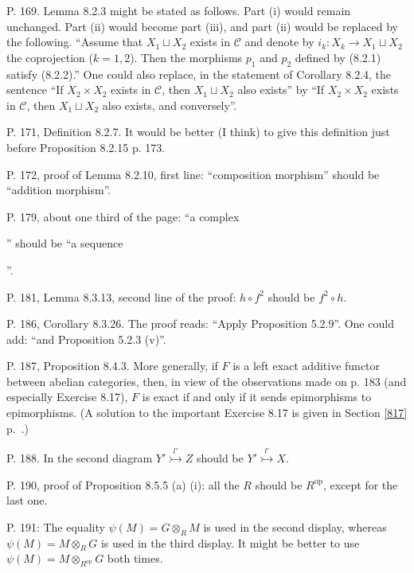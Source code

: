 \documentclass[12pt]{article}
\theoremstyle{remark}%
\newcommand{\n}{\noindent}
\newcommand{\C}{\mathcal C}
\newcommand{\m}{\rightarrowtail}
\DeclareMathOperator{\op}{op}
\begin{document}
\n P. 169. Lemma 8.2.3 might be stated as follows. Part (i) would remain unchanged. Part (ii) would become part (iii), and part (ii) would be replaced by the following. ``Assume that $X_1\sqcup X_2$ exists in $\C$ and denote by $i_k:X_k\to X_1\sqcup X_2$ the coprojection ($k=1,2$). Then the morphisms $p_1$ and $p_2$ defined by (8.2.1) satisfy (8.2.2).'' One could also replace, in the statement of Corollary 8.2.4, the sentence ``If $X_2\times X_2$ exists in $\C$, then $X_1\sqcup X_2$ also exists'' by ``If $X_2\times X_2$ exists in $\C$, then $X_1\sqcup X_2$ also exists, and conversely''. 

\n P. 171, Definition 8.2.7. It would be better (I think) to give this definition just before Proposition 8.2.15 p. 173. 

\n P. 172, proof of Lemma 8.2.10, first line: ``composition morphism'' should be ``addition morphism''. 

\n P. 179, about one third of the page: ``a complex 
'' 
should be ``a sequence 
''.

\n P. 181, Lemma 8.3.13, second line of the proof: $h\circ f^2$ should be $f^2\circ h$. 

\n P. 186, Corollary 8.3.26. The proof reads: ``Apply Proposition 5.2.9''. One could add: ``and Proposition 5.2.3 (v)''. 

\n P. 187, Proposition 8.4.3. More generally, if $F$ is a left exact additive functor between abelian categories, then, in view of the observations made on p. 183 (and especially Exercise 8.17), $F$ is exact if and only if it sends epimorphisms to epimorphisms. (A solution to the important Exercise 8.17 is given in Section \ref{817} p.~\pageref{817}.) 

\n P. 188. In the second diagram $Y'\overset{l'}{\m}Z$ should be $Y'\overset{l'}{\m}X$. 

\n P. 190, proof of Proposition 8.5.5 (a) (i): all the $R$ should be $R^{\op}$, except for the last one.

\n P. 191: The equality $\psi(M)=G\otimes_RM$ is used in the second display, whereas $\psi(M)=M\otimes_RG$ is used in the third display. It might be better to use $\psi(M)=M\otimes_{R^{\op}}G$ both times.
\end{document}
